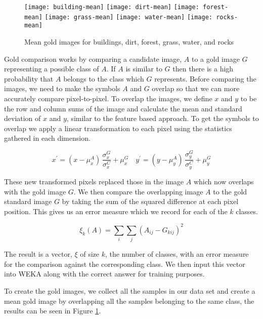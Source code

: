 
\begin{figure}[h]
\texttt{[image: building-mean]}
\texttt{[image: dirt-mean]}
\texttt{[image: forest-mean]}
\texttt{[image: grass-mean]}
\texttt{[image: water-mean]}
\texttt{[image: rocks-mean]}
\caption{Mean gold images for buildings, dirt, forest, grass, water, and rocks}
\label{figure:means}
\end{figure}


Gold comparison works by comparing a candidate image, $A$ to a gold image $G$
representing a possible class of $A$. If $A$ is similar to $G$ then there is
a high probability that $A$ belongs to the class which $G$ represents. Before
comparing the images, we need to make the symbols $A$ and $G$ overlap so that
we can more accurately compare pixel-to-pixel.
To overlap the images, we define $x$ and $y$ to be the row and column sums of the image and calculate the mean
and standard deviation of $x$ and $y$, similar to the feature based approach. To get the symbols to overlap we apply a
linear transformation to each pixel using the statistics gathered in each dimension.

\begin{equation} \label{eq:gold}
x^{\prime} = (x - \mu^{A}_{x}) \, \frac{\sigma^{G}_{x}}{\sigma^{C}_{x}} + \mu^{G}_{x} \quad
y^{\prime} = (y - \mu^{A}_{y}) \, \frac{\sigma^{G}_{y}}{\sigma^{C}_{y}} + \mu^{G}_{y}
\end{equation}

These new transformed pixels replaced those in the image $A$ which now overlaps with the
gold image $G$. We then compare the overlapping image $A$ to the gold standard image $G$ by taking the sum
of the squared difference at each pixel position. This gives us an error measure which we
record for each of the $k$ classes.

\[ \xi_{k}(A) = \sum_{i}\sum_{j}{(A_{ij} - G_{kij})^{2}} \]

The result is a vector, $\xi$ of size $k$, the number of classes, with an error measure for the
comparison against the corresponding class. We then input this vector into WEKA along
with the correct answer for training purposes.

To create the gold images, we collect all the samples in our data set and 
create a mean gold image by overlapping all the samples belonging to the same class,
the results can be seen in Figure \ref{figure:means}.
